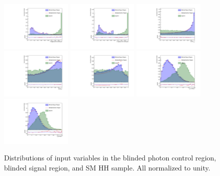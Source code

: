 \begin{figure}[thb]
  \centering
  \includegraphics[width=0.3\textwidth]{figures/sec-cats/mva/ljbdis}\hfil
  \includegraphics[width=0.3\textwidth]{figures/sec-cats/mva/sjbdis}\hfil
  \includegraphics[width=0.3\textwidth]{figures/sec-cats/mva/cts_cs}\hfil
  \includegraphics[width=0.3\textwidth]{figures/sec-cats/mva/ct_bb}\hfil
  \includegraphics[width=0.3\textwidth]{figures/sec-cats/mva/ct_gg}\hfil
  \includegraphics[width=0.3\textwidth]{figures/sec-cats/mva/gghhr}\hfil
  \includegraphics[width=0.3\textwidth]{figures/sec-cats/mva/bbhhr}\hfil
  \caption{Distributions of input variables in the blinded photon control region, blinded signal region, and SM HH sample. All normalized to unity. }
  \label{fig:inputmva}
\end{figure}

